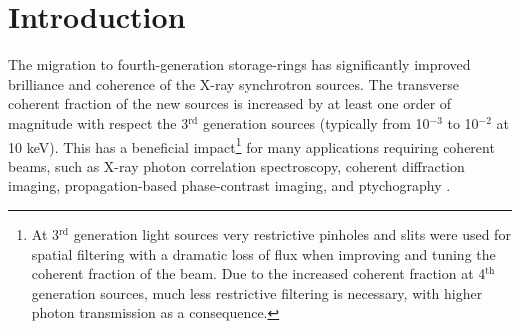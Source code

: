 \documentclass{iucr}              %
\begin{document}
\section{Introduction}
\label{sec:introduction}

The migration to fourth-generation storage-rings has significantly improved brilliance and coherence of the X-ray synchrotron sources. The transverse coherent fraction of the new sources is increased by at least one order of magnitude with respect the 3$^{\text{rd}}$ generation sources (typically from 10$^{-3}$ to 10$^{-2}$ at 10 keV). This has a beneficial impact\footnote{At 3$^{\text{rd}}$ generation light sources very restrictive pinholes and slits were used for spatial filtering with a dramatic loss of flux when improving and tuning the coherent fraction of the beam. Due to the increased coherent fraction at 4$^{\text{th}}$ generation sources, much less restrictive filtering is necessary, with higher photon transmission as a consequence.} for many applications requiring coherent beams, such as X-ray photon correlation spectroscopy, coherent diffraction imaging, propagation-based phase-contrast imaging, and ptychography \cite{paganin_book}.
\end{document}
